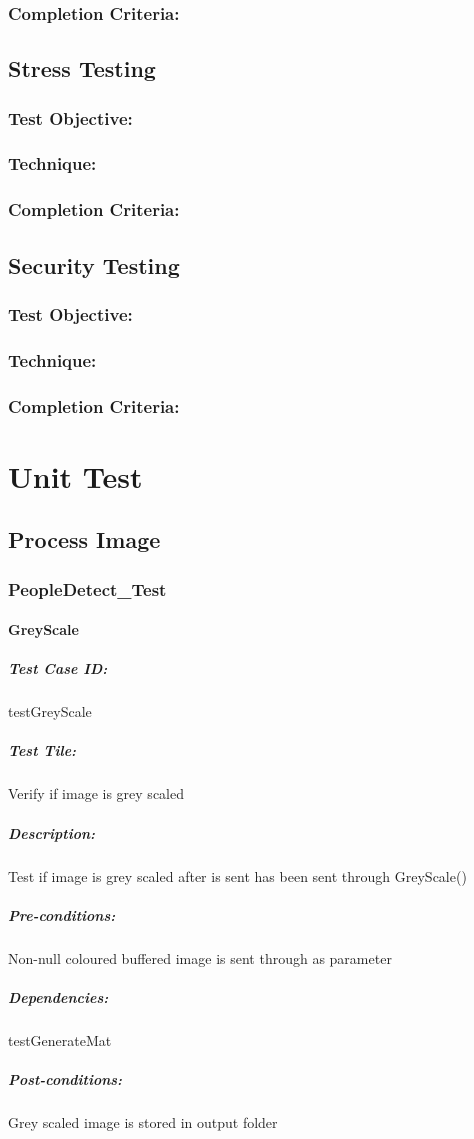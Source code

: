 \documentclass[a4paper,12pt]{report}
\begin{document}
			\subsubsection {Completion Criteria:}
			
		\subsection {Stress Testing}
			\subsubsection {Test Objective:}
			\subsubsection {Technique:}
			\subsubsection {Completion Criteria:}
			
		\subsection {Security Testing}
			\subsubsection {Test Objective:}
			\subsubsection {Technique:}
			\subsubsection {Completion Criteria:}
\fi

\section {Unit Test}
	\subsection {Process Image}
		\subsubsection {PeopleDetect\_Test}
			\paragraph {GreyScale}
				\subparagraph {Test Case ID:}
					testGreyScale
				\subparagraph {Test Tile:}
					Verify if image is grey scaled
				\subparagraph {Description:}
					Test if image is grey scaled after is sent has been sent through GreyScale()
				\subparagraph {Pre-conditions:}
					Non-null coloured buffered image is sent through as parameter
				\subparagraph {Dependencies:}
					testGenerateMat				
				\subparagraph {Post-conditions:}
					Grey scaled image is stored in output folder
					
\end{document}
